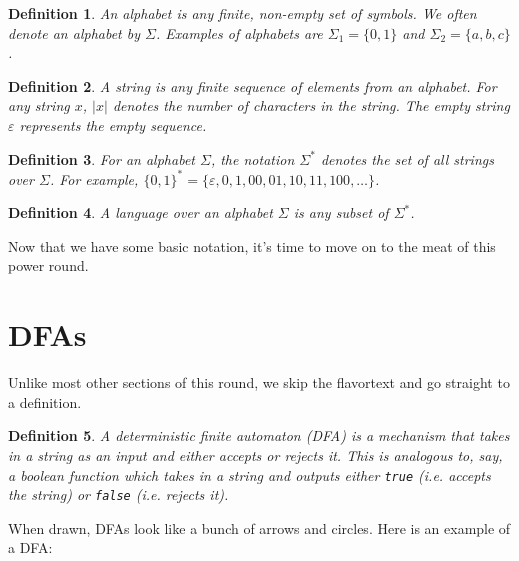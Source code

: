\documentclass[11pt]{article}
\newtheorem{defn}{Definition}[section]
\begin{document}
\begin{defn} An \emph{alphabet} is any finite, non-empty set of symbols. We often denote an alphabet by $\Sigma$.  Examples of alphabets are $\Sigma_1=\{0,1\}$ and $\Sigma_2=\{a,b,c\}$.\end{defn}

\begin{defn} A \emph{string} is any finite sequence of elements from an alphabet.  For any string $x$, $|x|$ denotes the number of characters in the string.  The empty string $\varepsilon$ represents the empty sequence.\end{defn}

\begin{defn}For an alphabet $\Sigma$, the notation $\Sigma^*$ denotes the set of all strings over $\Sigma$. For example, $\{0,1\}^*=\{\varepsilon,0,1,00,01,10,11,100,\dots\}$.\end{defn}

\begin{defn} A \emph{language} over an alphabet $\Sigma$ is any subset of $\Sigma^*$.\end{defn}

Now that we have some basic notation, it's time to move on to the meat of this power round.

\section{DFAs}

Unlike most other sections of this round, we skip the flavortext and go straight to a definition.

\begin{defn}A \emph{deterministic finite automaton} (DFA) is a mechanism that takes in a string as an input and either accepts or rejects it.  This is analogous to, say, a boolean function which takes in a string and outputs either \texttt{true} (i.e. accepts the string) or \texttt{false} (i.e. rejects it).\end{defn}

When drawn, DFAs look like a bunch of arrows and circles.  Here is an example of a DFA:

\begin{center}
\end{center}
\end{document}
